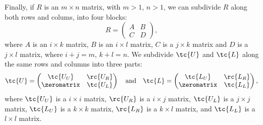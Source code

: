 Finally, if $R$ is an $m \times n$ matrix, with $m > 1$, $n > 1$, we can subdivide $R$ along both rows and colums, into four blocks:
\begin{equation*}
  R =
  \begin{pmatrix}
    A & B \\ 
    C & D
  \end{pmatrix},
\end{equation*}
where $A$ is an $i \times k$ matrix, $B$ is an $i \times l$ matrix, $C$ is a $j \times k$ matrix and $D$ is a $j \times l$ matrix, where $i + j = m$, $k + l = n$.
We subdivide $\tc{U}$ and $\tc{L}$ along the same rows and columns into three parts:
\begin{equation*}
  \tc{U} = 
  \begin{pmatrix}
    \tc{U_U} & \rc{U_R} \\
    \zeromatrix   & \tc{U_L}
  \end{pmatrix} \quad \text {and} \quad
  \tc{L} = 
  \begin{pmatrix}
    \tc{L_U} & \rc{L_R} \\
    \zeromatrix   & \tc{L_L}
  \end{pmatrix},
\end{equation*}
where $\tc{U_U}$ is a $i \times i$ matrix, $\rc{U_R}$ is a $i \times j$ matrix, $\tc{U_L}$ is a $j \times j$ matrix, $\tc{L_U}$ is a $k \times k$ matrix, $\rc{L_R}$ is a $k \times l$ matrix, and $\tc{L_L}$ is a $l \times l$ matrix. 

